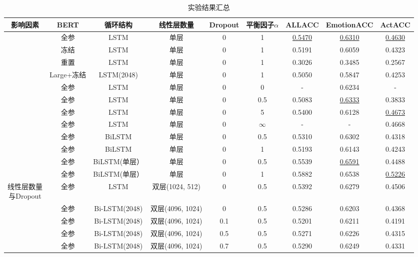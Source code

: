 \begin{table}[!ht]
	\centering
	\caption{实验结果汇总}
	\label{table:result}
	\begin{tabular}{ccccccccc}
		\toprule
		\textbf{影响因素} & \textbf{BERT} & \textbf{循环结构} & \textbf{线性层数量} & \textbf{Dropout} & \textbf{平衡因子$\alpha$} & \textbf{ALLACC} & \textbf{EmotionACC} & \textbf{ActACC} \\ \midrule
		\multirowcell{4}{预训练BERT模型} & 全参 & LSTM & 单层 & 0 & 1 & \underline{0.5470} & \underline{0.6310} & \underline{0.4630} \\ 
		~ & 冻结 & LSTM & 单层 & 0 & 1 & 0.5191 & 0.6059 & 0.4323 \\ 
		~ & 重置 & LSTM & 单层 & 0 & 1 & 0.3026 & 0.3485 & 0.2567 \\ 
		~ & Large+冻结 & LSTM(2048) & 单层 & 0 & 1 & 0.5050 & 0.5847 & 0.4253 \\ \midrule
		\multirowcell{4}{平衡因子$\alpha$} & 全参 & LSTM & 单层 & 0 & 0 & - & 0.6234 & - \\ 
		~ & 全参 & LSTM & 单层 & 0 & 0.5 & 0.5083 & \underline{0.6333} & 0.3833 \\ 
		~ & 全参 & LSTM & 单层 & 0 & 5 & 0.5400 & 0.6128 & \underline{0.4673} \\ 
		~ & 全参 & LSTM & 单层 & 0 & $\infty$ & - & - & 0.4668 \\ \midrule
		\multirowcell{4}{bidirectional} & 全参 & BiLSTM & 单层 & 0 & 0.5 & 0.5310 & 0.6302 & 0.4318 \\ 
		~ & 全参 & BiLSTM & 单层 & 0 & 1 & 0.5193 & 0.6143 & 0.4243 \\ 
		~ & 全参 & BiLSTM(单层） & 单层 & 0 & 0.5 & 0.5539 & \underline{0.6591} & 0.4488 \\ 
		~ & 全参 & BiLSTM(单层） & 单层 & 0 & 1 & 0.5882 & 0.6538 & \underline{0.5226} \\ \midrule
		\multirowcell{5}{线性层数量\\与Dropout} & 全参 & LSTM & 双层(1024, 512) & 0 & 0.5 & 0.5392 & 0.6279 & 0.4506 \\ 
		~ & 全参 & Bi-LSTM(2048) & 双层(4096, 1024) & 0 & 0.5 & 0.5286 & 0.6203 & 0.4368 \\ 
		~ & 全参 & Bi-LSTM(2048) & 双层(4096, 1024) & 0.1 & 0.5 & 0.5201 & 0.6211 & 0.4191 \\ 
		~ & 全参 & Bi-LSTM(2048) & 双层(4096, 1024) & 0.5 & 0.5 & 0.5271 & 0.6226 & 0.4315 \\ 
		~ & 全参 & Bi-LSTM(2048) & 双层(4096, 1024) & 0.7 & 0.5 & 0.5290 & 0.6249 & 0.4331 \\ \midrule

\end{tabular}
\end{table}
